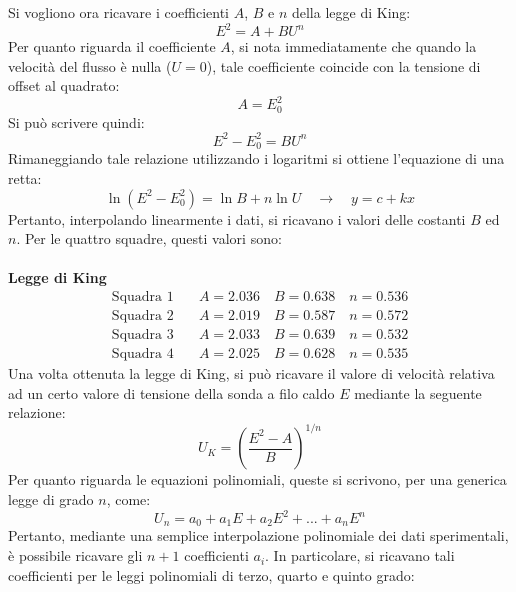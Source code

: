 \noindent Si vogliono ora ricavare i coefficienti $A$, $B$ e $n$ della legge di King:
\begin{equation*}
    E^2 = A + BU^n
\end{equation*}
Per quanto riguarda il coefficiente $A$, si nota immediatamente che quando la velocità del flusso è nulla ($U=0$), tale coefficiente coincide con la tensione di offset al quadrato:
\begin{equation*}
    A = E_0^2
\end{equation*}
Si può scrivere quindi:
\begin{equation*}
    E^2 - E_0^2 = BU^n
\end{equation*}
Rimaneggiando tale relazione utilizzando i logaritmi si ottiene l'equazione di una retta:
\begin{equation*}
    \ln(E^2-E_0^2) = \ln B + n \ln U \quad \rightarrow \quad y = c + kx
\end{equation*}
Pertanto, interpolando linearmente i dati, si ricavano i valori delle costanti $B$ ed $n$. Per le quattro squadre, questi valori sono:\\\\
\textbf{Legge di King}
\begin{equation*}
    \begin{split}
        \text{Squadra 1}\quad& A = 2.036 \quad B = 0.638 \quad n = 0.536\\
        \text{Squadra 2}\quad& A = 2.019 \quad B = 0.587 \quad n = 0.572\\
        \text{Squadra 3}\quad& A = 2.033 \quad B = 0.639 \quad n = 0.532\\
        \text{Squadra 4}\quad& A = 2.025 \quad B = 0.628 \quad n = 0.535
    \end{split}
\end{equation*}
Una volta ottenuta la legge di King, si può ricavare il valore di velocità relativa ad un certo valore di tensione della sonda a filo caldo $E$ mediante la seguente relazione:
\begin{equation*}
    U_{K} = \left( \frac{E^2 - A}{B} \right)^{1/n}
\end{equation*}
Per quanto riguarda le equazioni polinomiali, queste si scrivono, per una generica legge di grado $n$, come:
\begin{equation*}
    U_{n} = a_0 + a_1 E + a_2 E^2 + ... + a_n E^n
\end{equation*}
Pertanto, mediante una semplice interpolazione polinomiale dei dati sperimentali, è possibile ricavare gli $n+1$ coefficienti $a_i$. In particolare, si ricavano tali coefficienti per le leggi polinomiali di terzo, quarto e quinto grado:\\\\


